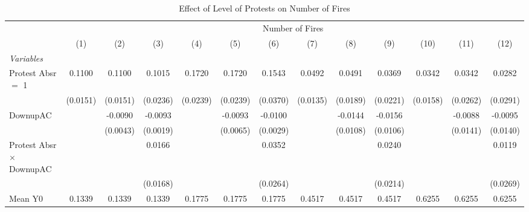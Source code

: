 
\begin{table}[htbp]
   \caption{\label{tab:protest_treat_main} Effect of Level of Protests on Number of Fires}
   \centering
   \begin{tabular}{lcccccccccccc}
      \tabularnewline \midrule \midrule
       & \multicolumn{12}{c}{Number of Fires}\\
                                            & (1)           & (2)           & (3)           & (4)           & (5)           & (6)           & (7)           & (8)           & (9)           & (10)          & (11)          & (12)\\  
      \midrule
      \emph{Variables}\\
      Protest Absr $=$ 1                    & 0.1100        & 0.1100        & 0.1015        & 0.1720        & 0.1720        & 0.1543        & 0.0492        & 0.0491        & 0.0369        & 0.0342        & 0.0342        & 0.0282\\   
                                            & (0.0151)      & (0.0151)      & (0.0236)      & (0.0239)      & (0.0239)      & (0.0370)      & (0.0135)      & (0.0189)      & (0.0221)      & (0.0158)      & (0.0262)      & (0.0291)\\   
      DownupAC                              &               & -0.0090       & -0.0093       &               & -0.0093       & -0.0100       &               & -0.0144       & -0.0156       &               & -0.0088       & -0.0095\\   
                                            &               & (0.0043)      & (0.0019)      &               & (0.0065)      & (0.0029)      &               & (0.0108)      & (0.0106)      &               & (0.0141)      & (0.0140)\\   
      Protest Absr $\times$ DownupAC        &               &               & 0.0166        &               &               & 0.0352        &               &               & 0.0240        &               &               & 0.0119\\   
                                            &               &               & (0.0168)      &               &               & (0.0264)      &               &               & (0.0214)      &               &               & (0.0269)\\   
      \hline Mean Y0                        & 0.1339        & 0.1339        & 0.1339        & 0.1775        & 0.1775        & 0.1775        & 0.4517        & 0.4517        & 0.4517        & 0.6255        & 0.6255        & 0.6255\\  

\end{tabular}
\end{table}
